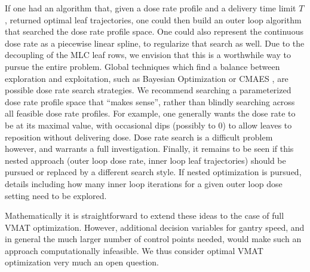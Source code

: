 \documentclass{iopart}
\begin{document}
If one had an algorithm that, given a dose rate profile and a delivery time limit $T$, returned optimal leaf trajectories, one could then build an outer loop algorithm that searched the dose rate profile space. One could also represent the continuous dose rate as a piecewise linear spline, to regularize that search as well. Due to the decoupling of the MLC leaf rows, we envision that this is a worthwhile way to pursue the entire problem. Global techniques which find a balance between exploration and exploitation, such as Bayesian Optimization or CMAES \cite{Hansen2001}, are possible dose rate search strategies. We recommend searching a parameterized dose rate profile space that ``makes sense'', rather than blindly searching across all feasible dose rate profiles. For example, one generally wants the dose rate to be at its maximal value, with occasional dips (possibly to 0) to allow leaves to reposition without delivering dose. Dose rate search is a difficult problem however, and warrants a full investigation. Finally, it remains to be seen if this nested approach (outer loop dose rate, inner loop leaf trajectories) should be pursued or replaced by a different search style. If nested optimization is pursued, details including how many inner loop iterations for a given outer loop dose setting need to be explored.


Mathematically it is straightforward to extend these ideas to the case of full VMAT optimization. However, additional decision variables for gantry speed, and in general the much larger number of control points needed, would make such an approach computationally infeasible. We thus consider optimal VMAT optimization very much an open question. 


\bigskip



\end{document}
